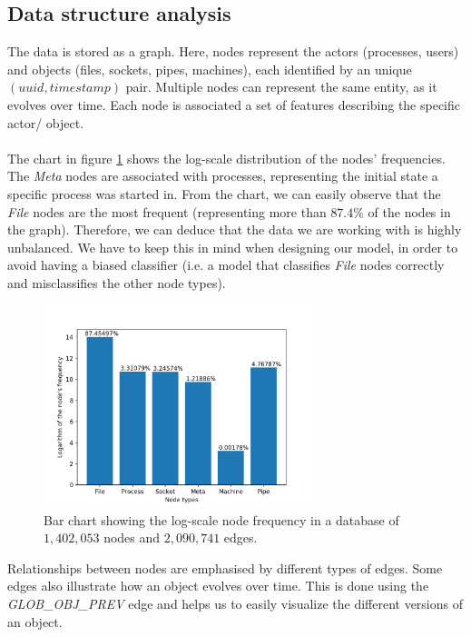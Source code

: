 	\subsection{Data structure analysis} \label{Section: prep/datastructure}
	The data is stored as a graph. Here, nodes represent the actors (processes, users) and objects (files, sockets, pipes, machines), each identified by an unique $(uuid, timestamp)$ pair. Multiple nodes can represent the same entity, as it evolves over time. Each node is associated a set of features describing the specific actor/ object. 
	\\ \\
	The chart in figure \ref{Figure 2.1.1} shows the log-scale distribution of the nodes' frequencies. The \textit{Meta} nodes are associated with processes, representing the initial state a specific process was started in. From the chart, we can easily observe that the \textit{File} nodes are the most frequent (representing more than $87.4\%$ of the nodes in the graph). Therefore, we can deduce that the data we are working with is highly unbalanced. We have to keep this in mind when designing our model, in order to avoid having a biased classifier (i.e. a model that classifies \textit{File} nodes correctly and misclassifies the other node types). 
	\begin{figure}[H]
		\centering

		\includegraphics[width=0.7\textwidth]{graphics/node-freq-graph}
		\caption[\textbf{Log-scale node frequency}]{
			Bar chart showing the log-scale node frequency in a database of $1,402,053$ nodes and $2,090,741$ edges. 
		}
		\label{Figure 2.1.1}
	\end{figure}
	Relationships between nodes are emphasised by different types of edges. Some edges also illustrate how an object evolves over time. This is done using the \textit{GLOB\_OBJ\_PREV} edge and helps us to easily visualize the different versions of an object.
